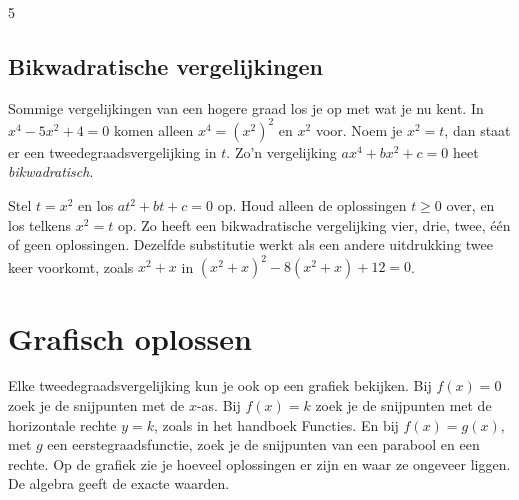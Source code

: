 \begin{alleenvoor}{5}
\subsection{Bikwadratische vergelijkingen}

Sommige vergelijkingen van een hogere graad los je op met wat je nu kent. In $x^4 - 5x^2 + 4 = 0$ komen alleen $x^4 = (x^2)^2$ en $x^2$ voor. Noem je $x^2 = t$, dan staat er een tweedegraadsvergelijking in $t$. Zo'n vergelijking $ax^4 + bx^2 + c = 0$ heet \textit{bikwadratisch}.


\begin{werkwijze}
Stel $t = x^2$ en los $at^2 + bt + c = 0$ op. Houd alleen de oplossingen $t \geqslant 0$ over, en los telkens $x^2 = t$ op. Zo heeft een bikwadratische vergelijking vier, drie, twee, één of geen oplossingen. Dezelfde substitutie werkt als een andere uitdrukking twee keer voorkomt, zoals $x^2 + x$ in $(x^2 + x)^2 - 8(x^2 + x) + 12 = 0$.
\end{werkwijze}

\begin{oefeningen}
\end{oefeningen}
\end{alleenvoor}

\section{Grafisch oplossen}

Elke tweedegraadsvergelijking kun je ook op een grafiek bekijken. Bij $f(x) = 0$ zoek je de snijpunten met de $x$-as. Bij $f(x) = k$ zoek je de snijpunten met de horizontale rechte $y = k$, zoals in het handboek Functies. En bij $f(x) = g(x)$, met $g$ een eerstegraadsfunctie, zoek je de snijpunten van een parabool en een rechte. Op de grafiek zie je hoeveel oplossingen er zijn en waar ze ongeveer liggen. De algebra geeft de exacte waarden.

